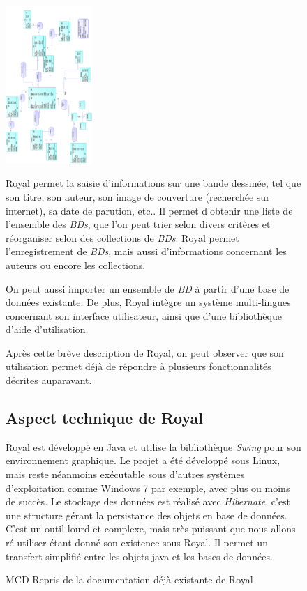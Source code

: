 \begin{figure}[h]
\begin{center}
 \includegraphics[height=6cm]{../img/MCD_Royal.png}
\end{center}
\caption{MCD Repris de la documentation déjà existante de Royal}

Royal permet la saisie d'informations sur une bande dessinée, tel que son titre, son auteur, son image de couverture (recherchée sur internet), sa date de parution, etc..
Il permet d'obtenir une liste de l'ensemble des \emph{BDs}, que l'on peut trier selon divers critères et réorganiser selon des collections de \emph{BDs}.
Royal permet l'enregistrement de \emph{BDs}, mais aussi d'informations concernant les auteurs ou encore les collections.

On peut aussi importer un ensemble de \emph{BD} à partir d'une base de données existante.
De plus, Royal intègre un système multi-lingues concernant son interface utilisateur, ainsi que d'une bibliothèque d'aide d'utilisation.

Après cette brève description de Royal, on peut observer que son utilisation permet déjà de répondre à plusieurs fonctionnalités décrites auparavant. 

\subsection{Aspect technique de Royal}
Royal est développé en Java et utilise la bibliothèque \emph{Swing} pour son environnement graphique. 
Le projet a été développé sous Linux, mais reste néanmoins exécutable sous d'autres systèmes d'exploitation comme Windows 7 par exemple, avec plus ou moins de succès. 
Le stockage des données est réalisé avec \emph{Hibernate}, c'est une structure gérant la persistance des objets en base de données. 
C'est un outil lourd et complexe, mais très puissant que nous allons ré-utiliser étant donné son existence sous Royal. 
Il permet un transfert simplifié entre les objets java et les bases de données.


\end{figure}

